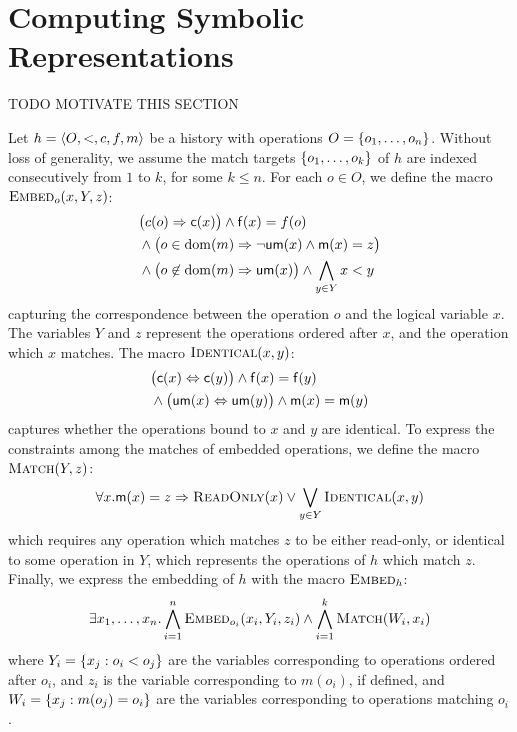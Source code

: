\section{Computing Symbolic Representations}
\label{sec:formula}

TODO MOTIVATE THIS SECTION

Let $h = \tup{O,<,c,f,m}$ be a history with operations $O = \set{ o_1, \ldots,
o_n }$. Without loss of generality, we assume the match targets $\set{o_1,
\ldots, o_k}$ of $h$ are indexed consecutively from $1$ to $k$, for some $k \le
n$. For each $o \in O$, we define the macro $\textsc{Embed}_o(x,Y,z)$:
\begin{align*}
  & \big(c(o) \implies {\sf c}(x)\big) \land {\sf f}(x) = f(o) \\
  & \land \big(o \in \dom(m)
    \implies \lnot{\sf um}(x) \land {\sf m}(x) = z\big) \\
  & \land \big(o \not\in \dom(m) \implies {\sf um}(x)\big)
    \land \bigwedge_{y \in Y} x < y
\end{align*}
capturing the correspondence between the operation $o$ and the logical variable
$x$. The variables $Y$ and $z$ represent the operations ordered after $x$, and
the operation which $x$ matches. The macro $\textsc{Identical}(x,y)$:
\begin{align*}
  & \big({\sf c}(x) \Leftrightarrow {\sf c}(y)\big)
  \land {\sf f}(x) = {\sf f}(y) \\
  & \land \big({\sf um}(x) \Leftrightarrow {\sf um}(y)\big)
  \land {\sf m}(x) = {\sf m}(y)
\end{align*}
captures whether the operations bound to $x$ and $y$ are identical.
To express the constraints among the matches of embedded operations, we define
the macro $\textsc{Match}(Y,z)$:
\begin{align*}
  \forall x.
  {\sf m}(x) = z \implies
  \textsc{ReadOnly}(x) \lor \bigvee_{y \in Y} \textsc{Identical}(x,y)
\end{align*}
which requires any operation which matches $z$ to be either read-only, or
identical to some operation in $Y$, which represents the operations of $h$
which match $z$. Finally, we express the embedding of $h$ with the macro
$\textsc{Embed}_h$:
\begin{align*}
  \exists x_1, \ldots, x_n.
  \bigwedge_{i=1}^{n} \textsc{Embed}_{o_i}(x_i,Y_i,z_i)
  \land \bigwedge_{i=1}^{k} \textsc{Match}(W_i, x_i)
\end{align*}
where $Y_i = \set{ x_j : o_i < o_j }$ are the variables corresponding to
operations ordered after $o_i$, and $z_i$ is the variable corresponding to
$m(o_i)$, if defined, and $W_i = \set{ x_j : m(o_j) = o_i }$ are the variables
corresponding to operations matching $o_i$.

